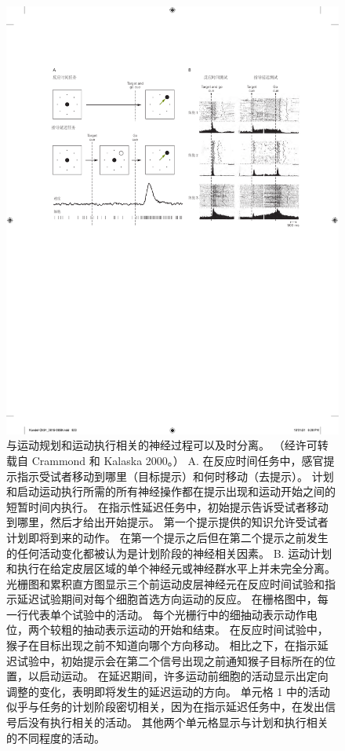 \begin{figure}[htbp]
	\centering
	\includegraphics[width=0.95\linewidth]{chap34/fig_34_4}
	\caption{与运动规划和运动执行相关的神经过程可以及时分离。 （经许可转载自 Crammond 和 Kalaska 2000。） A. 在反应时间任务中，感官提示指示受试者移动到哪里（目标提示）和何时移动（去提示）。 计划和启动运动执行所需的所有神经操作都在提示出现和运动开始之间的短暂时间内执行。 在指示性延迟任务中，初始提示告诉受试者移动到哪里，然后才给出开始提示。 第一个提示提供的知识允许受试者计划即将到来的动作。 在第一个提示之后但在第二个提示之前发生的任何活动变化都被认为是计划阶段的神经相关因素。 B. 运动计划和执行在给定皮层区域的单个神经元或神经群水平上并未完全分离。 光栅图和累积直方图显示三个前运动皮层神经元在反应时间试验和指示延迟试验期间对每个细胞首选方向运动的反应。 在栅格图中，每一行代表单个试验中的活动。 每个光栅行中的细抽动表示动作电位，两个较粗的抽动表示运动的开始和结束。 在反应时间试验中，猴子在目标出现之前不知道向哪个方向移动。 相比之下，在指示延迟试验中，初始提示会在第二个信号出现之前通知猴子目标所在的位置，以启动运动。 在延迟期间，许多运动前细胞的活动显示出定向调整的变化，表明即将发生的延迟运动的方向。 单元格 1 中的活动似乎与任务的计划阶段密切相关，因为在指示延迟任务中，在发出信号后没有执行相关的活动。 其他两个单元格显示与计划和执行相关的不同程度的活动。}
	\label{fig:34_4}
\end{figure}


